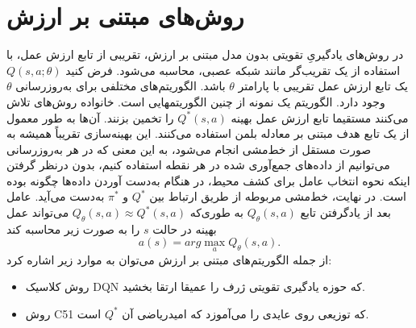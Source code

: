 \section{روش‌های مبتنی بر ارزش}


در روش‌های یادگیریِ تقویتی بدون مدل مبتنی بر ارزش،
تقریبی از تابع ارزش عمل، با استفاده از  یک تقریب‌گر
 مانند شبکه عصبی، محاسبه می‌شود. فرض کنید
$Q(s,a;\theta)$
یک تابع ارزش عمل تقریبی با پارامتر  
$\theta$ 
باشد.
الگوریتم‌های مختلفی برای به‌روزرسانی $\theta$ وجود دارد.
الگوریتم 
  یک نمونه از چنین الگوریتم\nf هایی ‌است.
  خانواده روش‌های 
    تلاش می‌کنند مستقیما تابع ارزش عمل بهینه $Q^*(s,a)$ را تخمین بزنند. آن‌ها به طور معمول از یک تابع هدف مبتنی بر معادله بلمن استفاده می‌کنند. این بهینه‌سازی تقریباً همیشه به صورت مستقل از خط‌مشی انجام می‌شود، به این معنی که در هر به‌روزرسانی می‌توانیم از داده‌های جمع‌آوری شده در هر نقطه استفاده کنیم، بدون  درنظر گرفتن اینکه نحوه انتخاب عامل برای کشف محیط، در هنگام به‌دست آوردن داده‌ها چگونه بوده است.  در نهایت، خط‌مشی مربوطه از طریق ارتباط بین 
 $Q^*$
  و
  $\pi^*$
  به‌دست می‌آید. 
  عامل بعد از یادگرفتن تابع $Q_\theta(s,a)$ به طوری‌که  $Q_\theta(s,a) \approx Q^*(s,a)$ می‌تواند عمل بهینه در حالت $s$ را به صورت زیر محاسبه کند $$a(s) = arg \max_a Q_{\theta}(s,a).$$
  از جمله الگوریتم‌های مبتنی بر ارزش می‌توان به موارد زیر اشاره کرد:
  \begin{itemize}
  	\item روش کلاسیک DQN که حوزه یادگیری تقویتی ژرف را عمیقا ارتقا بخشید.
  	\item روش C51 که توزیعی روی عایدی را می‌آموزد که امیدریاضی آن $Q^*$ است.
  \end{itemize}

